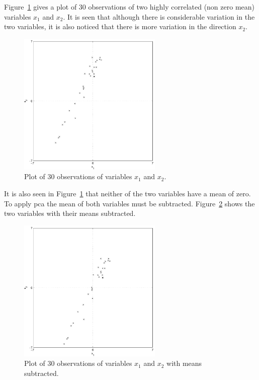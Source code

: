 Figure~\ref{fig:30observations} gives a plot of 30 observations of two highly correlated (non zero mean) variables $x_1$ and $x_2$. It is seen that although there is considerable variation in the two variables, it is also noticed that there is more variation in the direction $x_2$.
\begin{figure}[!]
  \begin{center}
    \includegraphics[width=260px]{30observations.pdf}
    \caption{Plot of 30 observations of variables $x_1$ and $x_2$.}\label{fig:30observations}
  \end{center}
\end{figure}

It is also seen in Figure~\ref{fig:30observations} that neither of the two variables have a mean of zero. To apply \gls{pca} the mean of both variables must be subtracted. Figure~\ref{fig:30observationsBar} shows the two variables with their means subtracted.
\begin{figure}[!]
  \begin{center}
    \includegraphics[width=260px]{30observationsBar.pdf}
    \caption{Plot of 30 observations of variables $x_1$ and $x_2$ with means subtracted.}\label{fig:30observationsBar}
  \end{center}
\end{figure}

